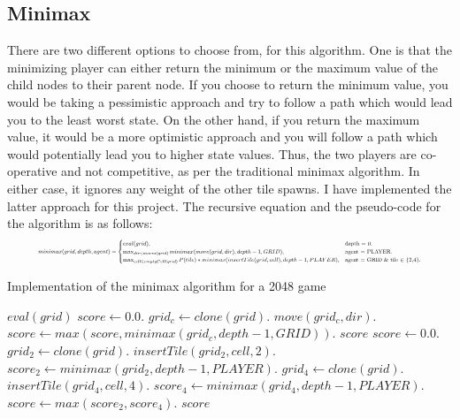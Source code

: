 \documentclass[english]{article}
\begin{document}
\subsection*{Minimax}
There are two different options to choose from, for this algorithm. One is that the minimizing player can either return the minimum or the maximum value of the child nodes to their parent node. If you choose to return the minimum value, you would be taking a pessimistic approach and try to follow a path which would lead you to the least worst state. On the other hand, if you return the maximum value, it would be a more optimistic approach and you will follow a path which would potentially lead you to higher state values. Thus, the two players are co-operative and not competitive, as per the traditional minimax algorithm. In either case, it ignores any weight of the other tile spawns. I have implemented the latter approach for this project. The recursive equation and the pseudo-code for the algorithm is as follows:
\begin{displaymath}
\resizebox{.9\hsize}{!}{$minimax(grid, depth, agent) =\begin{cases}
    eval(grid), & \text{depth = 0}.\\
    \max_{dir \in moves(grid)} minimax(move(grid, dir), depth-1, GRID), & \text{agent = PLAYER}.\\
    \max_{cell \in emptyCell(grid)} P(tile) * minimax(insertTile(grid, cell), depth-1, PLAYER), & \text{agent = GRID \& tile $\in$ \{2,4\}}.\end{cases}$}
\end{displaymath}

\begin{algorithm}
\caption{Implementation of the minimax algorithm for a 2048 game}
\begin{algorithmic}[1]
 \Return $\textit{eval}(grid)$
\State $score \gets 0.0$.
\State $grid_c \gets clone(grid)$.
\State $move(grid_c, dir)$.
\State $score \gets max(score, minimax(grid_c, depth-1, GRID))$.
\EndFor
\Return $\textit{score}$
\State $score \gets 0.0$.
\State $grid_2 \gets clone(grid)$.
\State $insertTile(grid_2, cell, 2)$.
\State $score_2 \gets minimax(grid_2, depth-1, PLAYER)$.
\State $grid_4 \gets clone(grid)$.
\State $insertTile(grid_4, cell, 4)$.
\State $score_4 \gets minimax(grid_4, depth-1, PLAYER)$.
\State $score \gets max(score_2, score_4)$.
\EndFor
\Return $\textit{score}$
\EndIf
\EndProcedure
\end{algorithmic}
\end{algorithm}
\end{document}
